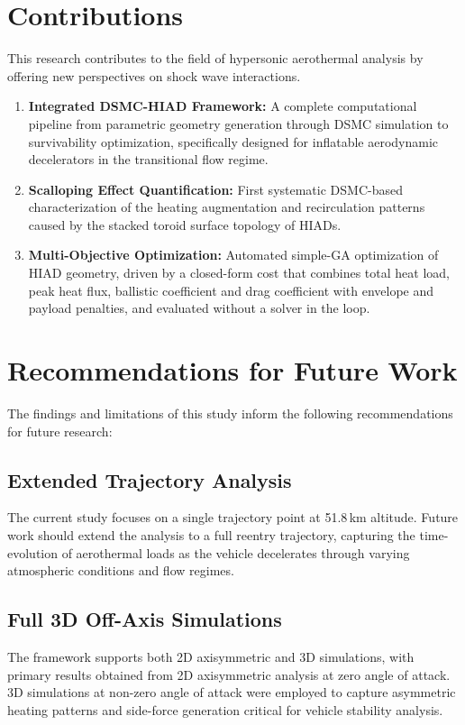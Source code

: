 \section{Contributions}
This research contributes to the field of hypersonic aerothermal analysis by offering new perspectives on shock wave interactions.
\begin{enumerate}
    \item \textbf{Integrated DSMC-HIAD Framework:} A complete computational pipeline from parametric geometry generation through DSMC simulation to survivability optimization, specifically designed for inflatable aerodynamic decelerators in the transitional flow regime.

    \item \textbf{Scalloping Effect Quantification:} First systematic DSMC-based characterization of the heating augmentation and recirculation patterns caused by the stacked toroid surface topology of HIADs.


    \item \textbf{Multi-Objective Optimization:} Automated simple-GA optimization of HIAD geometry, driven by a closed-form cost that combines total heat load, peak heat flux, ballistic coefficient and drag coefficient with envelope and payload penalties, and evaluated without a solver in the loop.
\end{enumerate}

\section{Recommendations for Future Work}
The findings and limitations of this study inform the following recommendations for future research:

\subsection{Extended Trajectory Analysis}
The current study focuses on a single trajectory point at 51.8\,km altitude. Future work should extend the analysis to a full reentry trajectory, capturing the time-evolution of aerothermal loads as the vehicle decelerates through varying atmospheric conditions and flow regimes.

\subsection{Full 3D Off-Axis Simulations}
The framework supports both 2D axisymmetric and 3D simulations, with primary results obtained from 2D axisymmetric analysis at zero angle of attack. 3D simulations at non-zero angle of attack were employed to capture asymmetric heating patterns and side-force generation critical for vehicle stability analysis.

